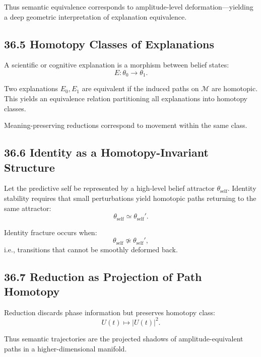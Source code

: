 \documentclass[12pt,letterpaper]{article}
\theoremstyle{remark}
\begin{document}
Thus semantic equivalence corresponds to amplitude-level deformation—yielding a deep geometric interpretation of explanation equivalence.

\subsection{36.5 Homotopy Classes of Explanations}

A scientific or cognitive explanation is a morphism between belief states:
\[
E : \theta_0 \to \theta_1.
\]

Two explanations $E_0, E_1$ are equivalent if the induced paths on $\mathcal{M}$ are homotopic. This yields an equivalence relation partitioning all explanations into homotopy classes.

Meaning-preserving reductions correspond to movement within the same class.

\subsection{36.6 Identity as a Homotopy-Invariant Structure}

Let the predictive self be represented by a high-level belief attractor $\theta_{\text{self}}$. Identity stability requires that small perturbations yield homotopic paths returning to the same attractor:
\[
\theta_{\text{self}} \simeq \theta_{\text{self}}'.
\]

Identity fracture occurs when:
\[
\theta_{\text{self}} \not\simeq \theta_{\text{self}}',
\]
i.e., transitions that cannot be smoothly deformed back.

\subsection{36.7 Reduction as Projection of Path Homotopy}

Reduction discards phase information but preserves homotopy class:
\[
U(t) \mapsto |U(t)|^2.
\]

Thus semantic trajectories are the projected shadows of amplitude-equivalent paths in a higher-dimensional manifold.
\end{document}
